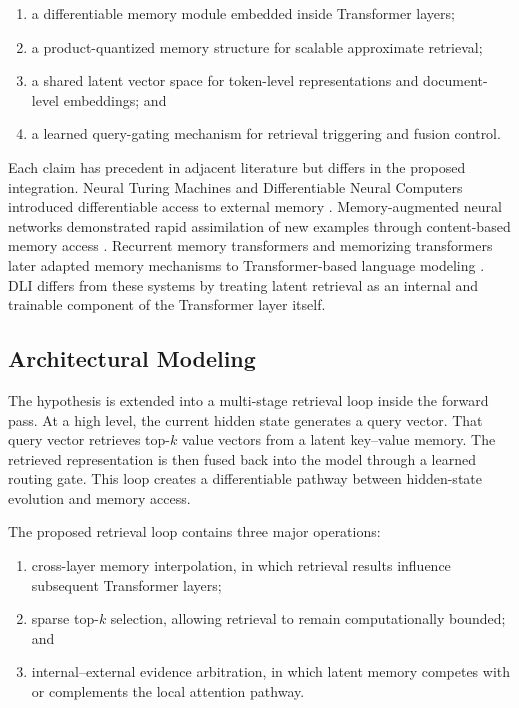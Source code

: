 \begin{enumerate}
    \item a differentiable memory module embedded inside Transformer layers;
    \item a product-quantized memory structure for scalable approximate retrieval;
    \item a shared latent vector space for token-level representations and document-level embeddings; and
    \item a learned query-gating mechanism for retrieval triggering and fusion control.
\end{enumerate}

Each claim has precedent in adjacent literature but differs in the proposed integration. Neural Turing Machines and Differentiable Neural Computers introduced differentiable access to external memory \cite{Graves2014,Graves2016}. Memory-augmented neural networks demonstrated rapid assimilation of new examples through content-based memory access \cite{Santoro2016}. Recurrent memory transformers and memorizing transformers later adapted memory mechanisms to Transformer-based language modeling \cite{Bulatov2022,Wu2022}. DLI differs from these systems by treating latent retrieval as an internal and trainable component of the Transformer layer itself.

\subsection{Architectural Modeling}
The hypothesis is extended into a multi-stage retrieval loop inside the forward pass. At a high level, the current hidden state generates a query vector. That query vector retrieves top-$k$ value vectors from a latent key--value memory. The retrieved representation is then fused back into the model through a learned routing gate. This loop creates a differentiable pathway between hidden-state evolution and memory access.

The proposed retrieval loop contains three major operations:

\begin{enumerate}
    \item cross-layer memory interpolation, in which retrieval results influence subsequent Transformer layers;
    \item sparse top-$k$ selection, allowing retrieval to remain computationally bounded; and
    \item internal--external evidence arbitration, in which latent memory competes with or complements the local attention pathway.
\end{enumerate}


